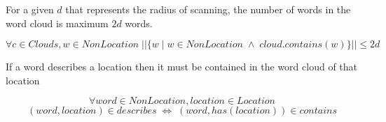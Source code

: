 \documentclass[11pt]{article}
\begin{document}
For a given $d$ that represents the radius of scanning, the number of words in
the word cloud is maximum $2d$ words.

$$ \forall c \in Clouds, w \in NonLocation \; || \{ w \; | \; w \in NonLocation
\; \wedge \; cloud.contains(w) \} || \leq 2d$$

If a word describes a location then it must be contained in the word cloud of
that location

$$ \forall word \in NonLocation, location \in Location $$
   $$ (word, location) \in describes \; \Leftrightarrow \;
   (word, has(location)) \in contains $$
\end{document}
